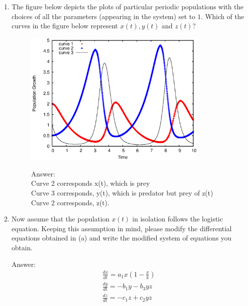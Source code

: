 \documentclass[12pt]{article}
\begin{document}
\begin{enumerate}[{\bf I.}]
\begin{enumerate}
  \item The figure below depicts the plots of particular periodic populations with the choices of all the parameters (appearing in the system) set to $1$. Which of the curves in the figure below represent $x(t), y(t)$ and $z(t)$?
  \begin{figure}[!ht]
    \centering
      \includegraphics[width=0.85\textwidth]{maxplot.eps} %
      
       Answer:\\
       Curve 2 corresponds x(t), which is prey\\
       Curve 3 corresponds, y(t), which is predator but prey of z(t)\\
       Curve 2 corresponds, z(t).\\  
  \end{figure} 
    \item Now assume that the population $x(t)$ in isolation follows the logistic equation. Keeping this assumption in mind, please modify the differential equations obtained in (a) and write the modified system of equations you obtain.
    
    Answer:\\
    \begin{align}
    \frac{dx}{dt} = a_1x(1 - \frac{x}{k}) \\
    \frac{dy}{dt} = -b_1y  -b_3yz\\
    \frac{dz}{dt} = -c_1z + c_2 yz\\
    \end{align}
 \end{enumerate}
\end{enumerate}
\end{document}
